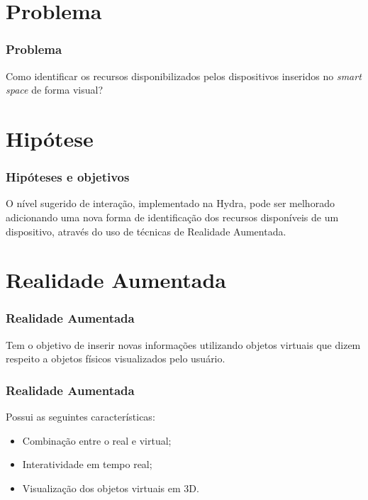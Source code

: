 \documentclass{beamer}
\begin{document}
\section{Problema}

	\begin{frame}
	    \frametitle{Problema}
	    Como identificar os recursos disponibilizados pelos dispositivos inseridos no \emph{smart space} 
	    de forma visual?
	\end{frame}		
    	
    	
    	
	
\section{Hipótese}
	\begin{frame}
		\frametitle{Hipóteses e objetivos}
		
		O nível sugerido de interação, implementado na Hydra, pode ser melhorado 
		adicionando uma nova forma de identificação dos recursos disponíveis de um
		dispositivo, através do uso de técnicas de Realidade Aumentada. 
		
	\end{frame}		


\section{Realidade Aumentada}
	
	
		\begin{frame}
			\frametitle{Realidade Aumentada}
			Tem o objetivo de inserir novas informações utilizando objetos virtuais 
			que dizem respeito a objetos físicos visualizados pelo usuário.
		\end{frame}		

		\begin{frame}
				\frametitle{Realidade Aumentada}
				Possui as seguintes características:
				
				\begin{itemize}
				  \item Combinação entre o real e virtual;
				  \item Interatividade em tempo real;
				  \item Visualização dos objetos virtuais em 3D.
				\end{itemize}
		\end{frame}
		
\end{document}
